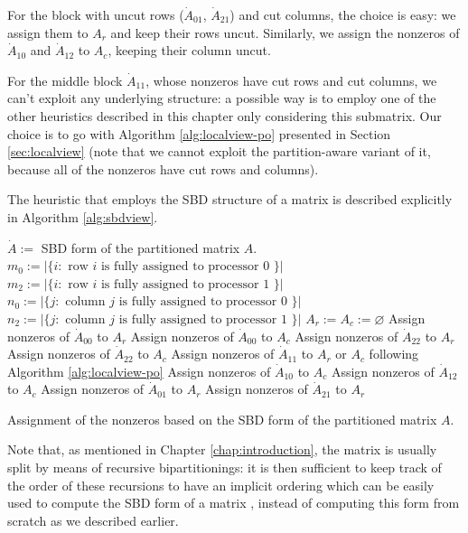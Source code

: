 For the block with uncut rows ($\dot{A}_{01}$, $\dot{A}_{21}$) and cut columns, the choice is easy: we assign them to $A_r$ and keep their rows uncut. Similarly, we assign the nonzeros of $\dot{A}_{10}$ and $\dot{A}_{12}$ to $A_c$, keeping their column uncut. 

For the middle block $\dot{A}_{11}$, whose nonzeros have cut rows and cut columns, we can't exploit any underlying structure: a possible way is to employ one of the other heuristics described in this chapter only considering this submatrix. Our choice is to go with Algorithm \ref{alg:localview-po} presented in Section \ref{sec:localview} (note that we cannot exploit the partition-aware variant of it, because all of the nonzeros have cut rows and columns).

The heuristic that employs the SBD structure of a matrix is described explicitly in Algorithm \ref{alg:sbdview}.

\begin{algorithm}[h]
	\begin{algorithmic}
		\State
		\State $\dot{A}:=$ SBD form of the partitioned matrix $A$.
		\State $m_0 := |\{ i : \text{ row } i \text{ is fully assigned to processor 0 } \}|$
		\State $m_2 := |\{ i : \text{ row } i \text{ is fully assigned to processor 1 } \}|$
		\State $n_0 := |\{ j : \text{ column } j \text{ is fully assigned to processor 0 } \}|$
		\State $n_2 := |\{ j : \text{ column } j \text{ is fully assigned to processor 1 } \}|$
		\State $A_r := A_c := \varnothing$
		\State Assign nonzeros of $\dot{A}_{00}$ to $A_r$
		\Else
		\State Assign nonzeros of $\dot{A}_{00}$ to $A_c$
		\EndIf
		\State Assign nonzeros of $\dot{A}_{22}$ to $A_r$
		\Else
		\State Assign nonzeros of $\dot{A}_{22}$ to $A_c$
		\EndIf
		\State Assign nonzeros of $\dot{A}_{11}$ to $A_r$ or $A_c$ following Algorithm \ref{alg:localview-po}
		\State Assign nonzeros of $\dot{A}_{10}$ to $A_c$
		\State Assign nonzeros of $\dot{A}_{12}$ to $A_c$
		\State Assign nonzeros of $\dot{A}_{01}$ to $A_r$
		\State Assign nonzeros of $\dot{A}_{21}$ to $A_r$
	\end{algorithmic}
	\caption{Assignment of the nonzeros based on the SBD form of the partitioned matrix $A$.} \label{alg:sbdview}
\end{algorithm}

Note that, as mentioned in Chapter \ref{chap:introduction}, the matrix is usually split by means of recursive bipartitionings: it is then sufficient to keep track of the order of these recursions to have an implicit ordering which can be easily used to compute the SBD form of a matrix \cite{yzelman_cache}, instead of computing this form from scratch as we described earlier.

